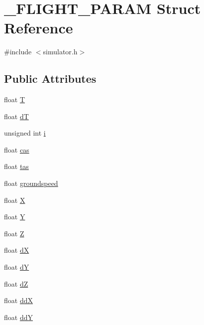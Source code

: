 \hypertarget{struct___f_l_i_g_h_t___p_a_r_a_m}{\section{\-\_\-\-F\-L\-I\-G\-H\-T\-\_\-\-P\-A\-R\-A\-M \-Struct \-Reference}
\label{struct___f_l_i_g_h_t___p_a_r_a_m}
}


{\ttfamily \#include $<$simulator.\-h$>$}

\subsection*{\-Public \-Attributes}
\begin{DoxyCompactItemize}
\item 
float \hyperlink{group___h_i_t_l_plugin_ga6c3abbd8306a5eb69384ca36f338991b}{\-T}
\item 
float \hyperlink{group___h_i_t_l_plugin_gabba6faff155324d93353abc952708700}{d\-T}
\item 
unsigned int \hyperlink{group___h_i_t_l_plugin_gafd95bf6c88f8e93baff6c5e27a5508a4}{i}
\item 
float \hyperlink{group___h_i_t_l_plugin_ga2fbe36224e421144a3822791ccd78c7b}{cas}
\item 
float \hyperlink{group___h_i_t_l_plugin_gad3fafd24c05ec4da9b2b230dfe6eec23}{tas}
\item 
float \hyperlink{group___h_i_t_l_plugin_ga2a4535a23a5ca83f655298d2494556d5}{groundspeed}
\item 
float \hyperlink{group___h_i_t_l_plugin_ga55a42deedc5785d55c570ae908bcc46a}{\-X}
\item 
float \hyperlink{group___h_i_t_l_plugin_gafb4f835313c27ac7b01fe3eb77b6bacc}{\-Y}
\item 
float \hyperlink{group___h_i_t_l_plugin_gacb21381efc860b328d0be136ef53f98c}{\-Z}
\item 
float \hyperlink{group___h_i_t_l_plugin_gaa09582d7507d6bc84817aad1828e79a6}{d\-X}
\item 
float \hyperlink{group___h_i_t_l_plugin_ga759dc6a87e18b4ee9e44c2ab66ba767f}{d\-Y}
\item 
float \hyperlink{group___h_i_t_l_plugin_gade2afe2cbfb8e8fe0f8d7d97e0e62076}{d\-Z}
\item 
float \hyperlink{group___h_i_t_l_plugin_gabb56dcac3d6e652f79e4a2fd79322e66}{dd\-X}
\item 
float \hyperlink{group___h_i_t_l_plugin_ga076f6e2f6b3ce2a8f01d26b3a7dac1bd}{dd\-Y}

\end{DoxyCompactItemize}
